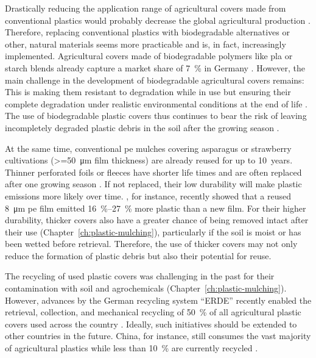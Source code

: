 Drastically reducing the application range of agricultural covers made from conventional plastics would probably decrease the global agricultural production \citep[Chapter~\ref{ch:plastic-mulching};][]{FAOAssessment2021}. Therefore, replacing conventional plastics with biodegradable alternatives or other, natural materials seems more practicable \citep{BrandesMikro2020} and is, in fact, increasingly implemented. Agricultural covers made of biodegradable polymers like \ac{pla} or starch blends already capture a market share of \SI{7}{\percent} in Germany \citep{BertlingKunststoffe2021}. However, the main challenge in the development of biodegradable agricultural covers remains: This is making them resistant to degradation while in use but ensuring their complete degradation under realistic environmental conditions at the end of life \citep[Chapter~\ref{ch:plastic-mulching};][]{BertlingKunststoffe2021}. The use of biodegradable plastic covers thus continues to bear the risk of leaving incompletely degraded plastic debris in the soil after the growing season \citep{SanderBiodegradation2019,VieraAre2021}.

At the same time, conventional \ac{pe} mulches covering asparagus or strawberry cultivations (\SI{>=50}{\micro\meter} film thickness) are already reused for up to \SI{10}{years}. Thinner perforated foils or fleeces have shorter life times and are often replaced after one growing season \citep[Chapter~\ref{ch:screening};][]{BertlingKunststoffe2021}. If not replaced, their low durability will make plastic emissions more likely over time. , for instance, recently showed that a reused \SI{8}{\micro\meter} \ac{pe} film emitted \SIrange{16}{27}{\percent} more plastic than a new film.
For their higher durability, thicker covers also have a greater chance of being removed intact after their use (Chapter~\ref{ch:plastic-mulching}), particularly if the soil is moist or has been wetted before retrieval.
Therefore, the use of thicker covers may not only reduce the formation of plastic debris but also their potential for reuse.

The recycling of used plastic covers was challenging in the past for their contamination with soil and agrochemicals (Chapter~\ref{ch:plastic-mulching}). However, advances by the German recycling system ``ERDE'' recently enabled the retrieval, collection, and mechanical recycling of \SI{50}{\percent} of all agricultural plastic covers used across the country \citep{BertlingKunststoffe2021,ERDERecyclingERDE2021}. Ideally, such initiatives should be extended to other countries in the future. China, for instance, still consumes the vast majority of agricultural plastics \citep[Chapter~\ref{ch:plastic-mulching};][]{MormileWorld2017} while less than \SI{10}{\percent} are currently recycled \citep{FAOAssessment2021}.

